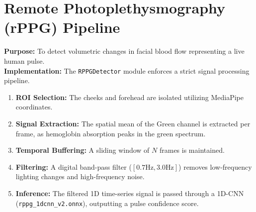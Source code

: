 \documentclass[12pt, a4paper]{report}
\begin{document}
\section{Remote Photoplethysmography (rPPG) Pipeline}
\textbf{Purpose:} To detect volumetric changes in facial blood flow representing a live human pulse. \\
\textbf{Implementation:} The \texttt{RPPGDetector} module enforces a strict signal processing pipeline.
\begin{enumerate}
    \item \textbf{ROI Selection:} The cheeks and forehead are isolated utilizing MediaPipe coordinates.
    \item \textbf{Signal Extraction:} The spatial mean of the Green channel is extracted per frame, as hemoglobin absorption peaks in the green spectrum.
    \item \textbf{Temporal Buffering:} A sliding window of $N$ frames is maintained.
    \item \textbf{Filtering:} A digital band-pass filter ($[0.7\text{Hz}, 3.0\text{Hz}]$) removes low-frequency lighting changes and high-frequency noise.
    \item \textbf{Inference:} The filtered 1D time-series signal is passed through a 1D-CNN (\texttt{rppg\_1dcnn\_v2.onnx}), outputting a pulse confidence score.
\end{enumerate}
\end{document}
